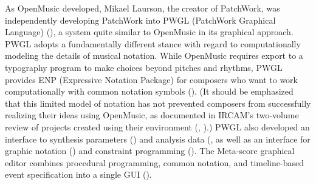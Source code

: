 As OpenMusic developed, Mikael Laurson, the creator of PatchWork, was independently developing PatchWork into PWGL (PatchWork Graphical Language) (\cite{Laurson:2003fh}), a system quite similar to OpenMusic in its graphical approach. PWGL adopts a fundamentally different stance with regard to computationally modeling the details of musical notation. While OpenMusic requires export to a typography program to make choices beyond pitches and rhythms, PWGL provides ENP (Expressive Notation Package) for composers who want to work computationally with common notation symbols (\cite{kuuskankare2009enp}). (It should be emphasized that this limited model of notation has not prevented composers from successfully realizing their ideas using OpenMusic, as documented in IRCAM's two-volume review of projects created using their environment (\cite{agon2006om}, \cite{Agon:2008xd}).) PWGL also developed an interface to synthesis parameters (\cite{laurson2005pwglsynth}) and analysis data (\cite{Kuuskankare:dq}, as well as an interface for graphic notation (\cite{kuuskankareconnecting}) and constraint programming (\cite{Laurson:2006oa}). The Meta-score graphical editor combines procedural programming, common notation, and timeline-based event specification into a single GUI (\cite{kuuskankare2012meta}).

